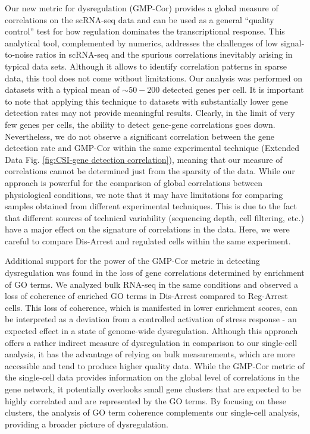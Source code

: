 \documentclass[12pt]{article}
\begin{document}
Our new metric for dysregulation (GMP-Cor) provides a global measure of correlations on the scRNA-seq data and can be used as a general ``quality control'' test for how regulation dominates the transcriptional response. This analytical tool, complemented by numerics, addresses the challenges of low signal-to-noise ratios in scRNA-seq and the spurious correlations inevitably arising in typical data sets. Although it allows to identify correlation patterns in sparse data, this tool does not come without limitations. Our analysis was performed on datasets with a typical mean of $\sim50-200$ detected genes per cell. It is important to note that applying this technique to datasets with substantially lower gene detection rates may not provide meaningful results. Clearly, in the limit of very few genes per cells, the ability to detect gene-gene correlations goes down. Nevertheless, we do not observe a significant correlation between the gene detection rate and GMP-Cor within the same experimental technique (Extended Data Fig. \ref{fig:CSI-gene detection correlation}), meaning that our measure of correlations cannot be determined just from the sparsity of the data. While our approach is powerful for the comparison of global correlations between physiological conditions, we note that it may have limitations for comparing samples obtained from different experimental techniques. This is due to the fact that different sources of technical variability (sequencing depth, cell filtering, etc.) have a major effect on the signature of correlations in the data. Here, we were careful to compare Dis-Arrest and regulated cells within the same experiment. \par
Additional support for the power of the GMP-Cor metric in detecting dysregulation was found in the loss of gene correlations determined by enrichment of GO terms. We analyzed bulk RNA-seq in the same conditions and observed a loss of coherence of enriched GO terms in Dis-Arrest compared to Reg-Arrest cells. This loss of coherence, which is manifested in lower enrichment scores, can be interpreted as a deviation from a controlled activation of stress response - an expected effect in a state of genome-wide dysregulation. Although this approach offers a rather indirect measure of dysregulation in comparison to our single-cell analysis, it has the advantage of relying on bulk measurements, which are more accessible and tend to produce higher quality data. While the GMP-Cor metric of the single-cell data provides information on the global level of correlations in the gene network, it potentially overlooks small gene clusters that are expected to be highly correlated and are represented by the GO terms. By focusing on these clusters, the analysis of GO term coherence complements our single-cell analysis, providing a broader picture of dysregulation. \par
\end{document}
